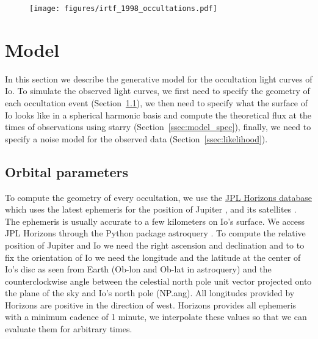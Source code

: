 \documentclass[linenumbers,modern]{aastex62}
\begin{document}
\begin{figure}[t!]
    \begin{centering}
    \texttt{[image: figures/irtf\_1998\_occultations.pdf]}
    \end{centering}
\end{figure}

\section{Model}
\label{sec:model}
In this section we describe the generative model for the occultation light curves of Io.
To simulate the observed light curves, we first need to specify the geometry of each occultation event (Section~\ref{ssec:orbital_parameters}), we then need to specify what the surface of Io looks like in a spherical harmonic basis and compute the theoretical flux at the times of observations using \textsf{starry} (Section~\ref{ssec:model_spec}), finally, we need to specify a noise model for the observed data (Section~\ref{ssec:likelihood}).

\subsection{Orbital parameters}
\label{ssec:orbital_parameters}
To compute the geometry of every occultation, we use the \href{https://ssd.jpl.nasa.gov/horizons.cgi}{JPL Horizons database} which uses the latest ephemeris for the position of Jupiter \citep{folkner2014}, and its satellites \citep{jacobson2015}.
The ephemeris is usually accurate to a few kilometers on Io's surface.
We access JPL Horizons through the Python package \textsf{astroquery} \citep{ginsburg2019}.
To compute the relative position of Jupiter and Io we need the right ascension and declination and to to fix the orientation of Io we need the longitude and the latitude at the center of Io's disc as seen from Earth (\textsf{Ob-lon} and \textsf{Ob-lat} in \textsf{astroquery}) and the counterclockwise angle between the celestial north pole unit vector projected onto the plane of the sky and Io's north pole (\textsf{NP.ang}).
All longitudes provided by Horizons are positive  in the direction of west.
Horizons provides all ephemeris with a minimum cadence of 1 minute, we interpolate these values so that we can evaluate them for arbitrary times.
\end{document}
